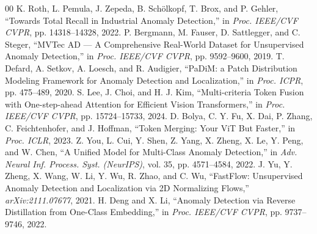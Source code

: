 \documentclass[10pt,journal,compsoc]{IEEEtran}
\begin{document}
\begin{thebibliography}{00}
 K. Roth, L. Pemula, J. Zepeda, B. Schölkopf, T. Brox, and P. Gehler, ``Towards Total Recall in Industrial Anomaly Detection,'' in \textit{Proc. IEEE/CVF CVPR}, pp. 14318--14328, 2022.
 P. Bergmann, M. Fauser, D. Sattlegger, and C. Steger, ``MVTec AD --- A Comprehensive Real-World Dataset for Unsupervised Anomaly Detection,'' in \textit{Proc. IEEE/CVF CVPR}, pp. 9592--9600, 2019.
 T. Defard, A. Setkov, A. Loesch, and R. Audigier, ``PaDiM: a Patch Distribution Modeling Framework for Anomaly Detection and Localization,'' in \textit{Proc. ICPR}, pp. 475--489, 2020.
 S. Lee, J. Choi, and H. J. Kim, ``Multi-criteria Token Fusion with One-step-ahead Attention for Efficient Vision Transformers,'' in \textit{Proc. IEEE/CVF CVPR}, pp. 15724--15733, 2024.
 D. Bolya, C. Y. Fu, X. Dai, P. Zhang, C. Feichtenhofer, and J. Hoffman, ``Token Merging: Your ViT But Faster,'' in \textit{Proc. ICLR}, 2023.
 Z. You, L. Cui, Y. Shen, Z. Yang, X. Zheng, X. Le, Y. Peng, and W. Chen, ``A Unified Model for Multi-Class Anomaly Detection,'' in \textit{Adv. Neural Inf. Process. Syst. (NeurIPS)}, vol. 35, pp. 4571--4584, 2022.
 J. Yu, Y. Zheng, X. Wang, W. Li, Y. Wu, R. Zhao, and C. Wu, ``FastFlow: Unsupervised Anomaly Detection and Localization via 2D Normalizing Flows,'' \textit{arXiv:2111.07677}, 2021.
 H. Deng and X. Li, ``Anomaly Detection via Reverse Distillation from One-Class Embedding,'' in \textit{Proc. IEEE/CVF CVPR}, pp. 9737--9746, 2022.
\end{thebibliography}
\end{document}
